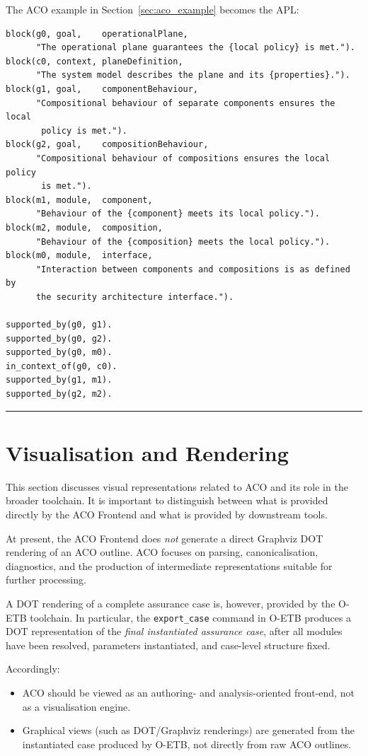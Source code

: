 \documentclass[11pt,twoside,a4paper]{article}
\begin{document}
The ACO example in Section~\ref{sec:aco_example} becomes the APL:

\begin{verbatim}
block(g0, goal,    operationalPlane,
      "The operational plane guarantees the {local policy} is met.").
block(c0, context, planeDefinition,
      "The system model describes the plane and its {properties}.").
block(g1, goal,    componentBehaviour,
      "Compositional behaviour of separate components ensures the local
       policy is met.").
block(g2, goal,    compositionBehaviour,
      "Compositional behaviour of compositions ensures the local policy
       is met.").
block(m1, module,  component,
      "Behaviour of the {component} meets its local policy.").
block(m2, module,  composition,
      "Behaviour of the {composition} meets the local policy.").
block(m0, module,  interface,
      "Interaction between components and compositions is as defined by
      the security architecture interface.").

supported_by(g0, g1).
supported_by(g0, g2).
supported_by(g0, m0).
in_context_of(g0, c0).
supported_by(g1, m1).
supported_by(g2, m2).
\end{verbatim}

\bigskip
\hrule
\bigskip

\section{Visualisation and Rendering}

This section discusses visual representations related to ACO and its role in the
broader toolchain. It is important to distinguish between what is provided directly
by the ACO Frontend and what is provided by downstream tools.

At present, the ACO Frontend does \emph{not} generate a direct Graphviz DOT rendering
of an ACO outline. ACO focuses on parsing, canonicalisation, diagnostics, and the
production of intermediate representations suitable for further processing.

A DOT rendering of a complete assurance case is, however, provided by the O-ETB
toolchain. In particular, the \texttt{export\_case} command in O-ETB produces a DOT
representation of the \emph{final instantiated assurance case}, after all modules
have been resolved, parameters instantiated, and case-level structure fixed.

Accordingly:
\begin{itemize}[leftmargin=2em]
  \item ACO should be viewed as an authoring- and analysis-oriented front-end,
        not as a visualisation engine.
  \item Graphical views (such as DOT/Graphviz renderings) are generated from the
        instantiated case produced by O-ETB, not directly from raw ACO outlines.
\end{itemize}
\end{document}
